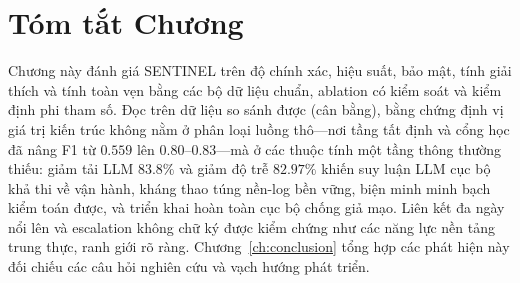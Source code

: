 \section{Tóm tắt Chương}
Chương này đánh giá SENTINEL trên độ chính xác, hiệu suất, bảo mật, tính giải thích và tính toàn vẹn bằng các bộ dữ liệu chuẩn, ablation có kiểm soát và kiểm định phi tham số. Đọc trên dữ liệu so sánh được (cân bằng), bằng chứng định vị giá trị kiến trúc không nằm ở phân loại luồng thô---nơi tầng tất định và cổng học đã nâng F1 từ $0.559$ lên $0.80$--$0.83$---mà ở các thuộc tính một tầng thông thường thiếu: giảm tải LLM $83.8\%$ và giảm độ trễ $82.97\%$ khiến suy luận LLM cục bộ khả thi về vận hành, kháng thao túng nền-log bền vững, biện minh minh bạch kiểm toán được, và triển khai hoàn toàn cục bộ chống giả mạo. Liên kết đa ngày nổi lên và escalation không chữ ký được kiểm chứng như các năng lực nền tảng trung thực, ranh giới rõ ràng. Chương~\ref{ch:conclusion} tổng hợp các phát hiện này đối chiếu các câu hỏi nghiên cứu và vạch hướng phát triển.
